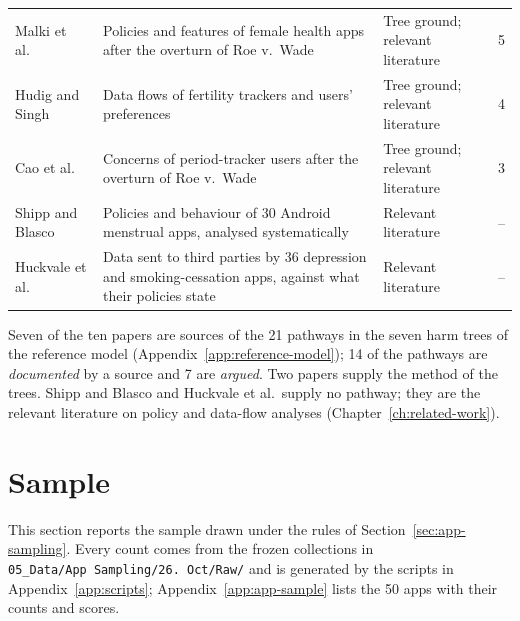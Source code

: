 \begin{table}[H]
\begin{singlespace}
\begin{tabularx}{\textwidth}{@{}>{\raggedright\arraybackslash}p{3.1cm}>{\raggedright\arraybackslash}X>{\raggedright\arraybackslash}p{1.9cm}r@{}}
\addlinespace
Malki et al.~\parencite{malki2024exploring} & Policies and features of female health apps after the overturn of Roe v.~Wade & Tree ground; relevant literature & 5 \\
\addlinespace
Hudig and Singh~\parencite{hudig2025intimate} & Data flows of fertility trackers and users' preferences & Tree ground; relevant literature & 4 \\
\addlinespace
Cao et al.~\parencite{cao2024deleted} & Concerns of period-tracker users after the overturn of Roe v.~Wade & Tree ground; relevant literature & 3 \\
\addlinespace
Shipp and Blasco~\parencite{shipp2020period} & Policies and behaviour of 30 Android menstrual apps, analysed systematically & Relevant literature & -- \\
\addlinespace
Huckvale et al.~\parencite{huckvale2019assessment} & Data sent to third parties by 36 depression and smoking-cessation apps, against what their policies state & Relevant literature & -- \\
\bottomrule
\end{tabularx}
\end{singlespace}
\end{table}

Seven of the ten papers are sources of the 21 pathways in the seven harm trees of the reference
model (Appendix~\ref{app:reference-model}); 14 of the pathways are \emph{documented} by a source
and 7 are \emph{argued}. Two papers supply the method of the trees. Shipp and Blasco and Huckvale et al.\ supply no pathway;
they are the relevant literature on policy and data-flow analyses
(Chapter~\ref{ch:related-work}).

\section{Sample}
\label{sec:results-sample}
This section reports the sample drawn under the rules of Section~\ref{sec:app-sampling}. Every
count comes from the frozen collections in \texttt{05\_Data/App~Sampling/26.~Oct/Raw/} and is
generated by the scripts in Appendix~\ref{app:scripts}; Appendix~\ref{app:app-sample} lists the 50
apps with their counts and scores.

